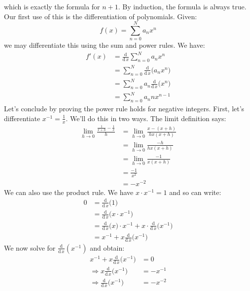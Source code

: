 \documentclass{article}
\theoremstyle{plain}
\begin{document}
    which is exactly the formula for $n+1$. By induction, the formula is always
    true. Our first use of this is the differentiation of polynomials. Given:
    \begin{equation}
        f(x)=\sum_{n=0}^{N}a_{n}x^{n}
    \end{equation}
    we may differentiate this using the sum and power rules. We have:
    \begin{align}
        f'(x)
        &=\frac{\textrm{d}}{\textrm{d}\,x}\sum_{n=0}^{N}a_{n}x^{n}
            \tag{Definition}\\
        &=\sum_{n=0}^{N}\frac{\textrm{d}}{\textrm{d}\,x}\big(a_{n}x^{n}\big)
            \tag{Sum Rule}\\
        &=\sum_{n=0}^{N}a_{n}\frac{\textrm{d}}{\textrm{d}\,x}\big(x^{n}\big)
            \tag{Factoring Constants}\\
        &=\sum_{n=0}^{N}a_{n}nx^{n-1}
            \tag{Power Rule}
    \end{align}
    Let's conclude by proving the power rule holds for negative integers.
    First, let's differentiate $x^{-1}=\frac{1}{x}$. We'll do this in two ways.
    The limit definition says:
    \begin{align}
        \lim_{h\rightarrow{0}}\frac{\frac{1}{x+h}-\frac{1}{x}}{h}
        &=\lim_{h\rightarrow{0}}\frac{x-(x+h)}{hx(x+h)}\\
        &=\lim_{h\rightarrow{0}}\frac{-h}{hx(x+h)}\\
        &=\lim_{h\rightarrow{0}}\frac{-1}{x(x+h)}\\
        &=\frac{-1}{x^{2}}\\
        &=-x^{-2}
    \end{align}
    We can also use the product rule. We have $x\cdot{x}^{-1}=1$ and so can
    write:
    \begin{align}
        0
        &=\frac{\textrm{d}}{\textrm{d}\,x}\big(1\big)\\
        &=\frac{\textrm{d}}{\textrm{d}\,x}\big(x\cdot{x}^{-1}\big)\\
        &=\frac{\textrm{d}}{\textrm{d}\,x}\big(x)\cdot{x}^{-1}
            +x\cdot\frac{\textrm{d}}{\textrm{d}\,x}\big(x^{-1}\big)\\
        &=x^{-1}+x\frac{\textrm{d}}{\textrm{d}\,x}\big(x^{-1}\big)
    \end{align}
    We now solve for $\frac{\textrm{d}}{\textrm{d}\,x}(x^{-1})$ and obtain:
    \begin{align}
        x^{-1}+x\frac{\textrm{d}}{\textrm{d}\,x}\big(x^{-1}\big)&=0\\
        \Rightarrow
            x\frac{\textrm{d}}{\textrm{d}\,x}\big(x^{-1}\big)&=-x^{-1}\\
        \Rightarrow
            \frac{\textrm{d}}{\textrm{d}\,x}\big(x^{-1}\big)&=-x^{-2}
    \end{align}
\end{document}
